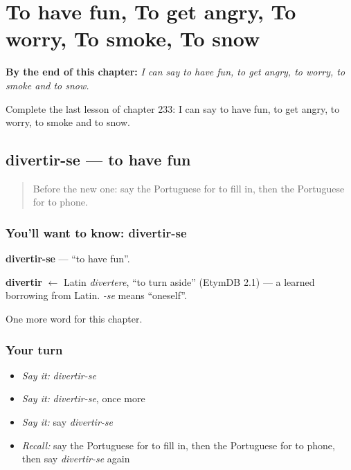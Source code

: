 
\chapter{To have fun, To get angry, To worry, To smoke, To snow}
\label{ch:pt-to-have-fun-to-get-angry-to-worry-to-smoke-to-snow}

\begin{chapteropening}
\textbf{By the end of this chapter:} \emph{I can say to have fun, to get angry, to worry, to smoke and to snow.}

Complete the last lesson of chapter 233: I can say to have fun, to get angry, to worry, to smoke and to snow.
\end{chapteropening}

\section[divertir-se]{divertir-se — to have fun}

\label{lesson:PT-C233-divertir-se}



\begin{quote}
Before the new one: say the Portuguese for to fill in, then the Portuguese for to phone.
\end{quote}

\subsection*{You'll want to know: divertir-se}
\textbf{divertir-se} — \textquotedblleft{}to have fun\textquotedblright{}.

\begin{cousinweb}
\textbf{divertir} $\leftarrow$ Latin \emph{divertere}, \textquotedblleft{}to turn aside\textquotedblright{} (EtymDB 2.1) — a learned borrowing from Latin. \emph{-se} means \textquotedblleft{}oneself\textquotedblright{}.
\end{cousinweb}

\begin{grammarlens}[title={What you've built}]
One more word for this chapter.
\end{grammarlens}

\subsection*{Your turn}
\begin{itemize}
\raggedright
  \item \emph{Say it:} \emph{divertir-se}
  \item \emph{Say it:} \emph{divertir-se}, once more
  \item \emph{Say it:} say \emph{divertir-se}
  \item \emph{Recall:} say the Portuguese for to fill in, then the Portuguese for to phone, then say \emph{divertir-se} again
\end{itemize}

